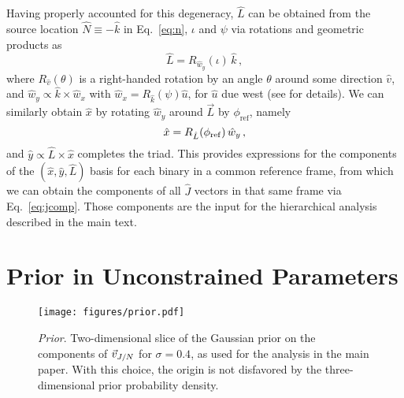 \documentclass[twocolumn,twocolappendix,linenumbers]{aastex631}
\begin{document}
Having properly accounted for this degeneracy, $\hat{L}$ can be obtained from the source location $\hat{N} \equiv - \hat{k}$ in Eq.~\eqref{eq:n}, $\iota$ and $\psi$ via rotations and geometric products as
\begin{equation}
\hat{L} = R_{\hat{w}_y}(\iota)\, \hat{k} \, ,
\end{equation}
where $R_{\hat{v}}(\theta)$ is a right-handed rotation by an angle $\theta$ around some direction $\hat{v}$, and $\hat{w}_y \propto \hat{k} \times \hat{w}_x$ with $\hat{w}_x = R_{\hat{k}}(\psi) \hat{u}$, for $\hat{u}$ due west (see \citep{Anderson:T010110} for details).
We can similarly obtain $\hat{x}$ by rotating $\hat{w}_y$ around $\vec{L}$ by $\phi_\mathrm{ref}$, namely
\begin{equation}
\hat{x} = R_{\hat{L}}(\phi_{\rm ref})\, \hat{w}_y \, ,
\end{equation}
and $\hat{y} \propto \hat{L} \times \hat{x}$ completes the triad.
This provides expressions for the components of the $(\hat{x}, \hat{y}, \hat{L})$ basis for each binary in a common reference frame, from which we can obtain the components of all $\hat{J}$ vectors in that same frame via Eq.~\eqref{eq:jcomp}.
Those components are the input for the hierarchical analysis described in the main text.

\section{Prior in Unconstrained Parameters}
\label{app:prior}

\begin{figure}
\texttt{[image: figures/prior.pdf]}
\caption{\emph{Prior}. Two-dimensional slice of the Gaussian prior on the components of $\vec{v}_{J/N}$ for $\sigma = 0.4$, as used for the analysis in the main paper.
With this choice, the origin is not disfavored by the three-dimensional prior probability density.
}
\label{fig:prior}
\end{figure}
\end{document}
